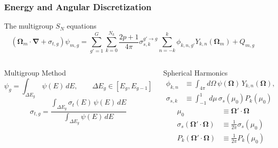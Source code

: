 \documentclass[compress,10pt]{beamer}
\renewcommand{\vec}[1]{\mathbf{#1}}
\begin{document}
\typeout{***********************************************************************************}
\begin{frame}[t]\frametitle{Energy and Angular Discretization}
\begin{block}{The multigroup $S_N$ equations}{\small
\begin{equation*}
\left( \vec{\Omega}_m \cdot \vec{\nabla}  + \sigma_{t,g}  \right)  \psi_{m,g}= \sum_{g'=1}^{G} \sum_{k=0}^{N_k} \frac{2p + 1}{4 \pi} \sigma_{s,k}^{g' \rightarrow g}   \sum_{n=-k}^{k}  \phi_{k,n,g'}  Y_{k,n} (  \vec{\Omega}_m ) +  Q_{m,g}
\end{equation*}}
\end{block}
\centering
\begin{columns}
\begin{block}{Multigroup Method}{\small
\begin{equation*}
\psi_g =\int_{\Delta E_g} \, \psi ( E) \, dE , \qquad \Delta E_g \in \left[  E_g , E_{g-1} \right]
\end{equation*} 
\begin{equation*}
\sigma_{t,g} = \frac{\int_{\Delta E_g} \sigma_t (E) \, \psi (E) \, dE }{\int_{\Delta E_g} \psi (E) \, dE }
\end{equation*} 
}\end{block}
\begin{block}{Spherical Harmonics}{\small
\vspace{-0.15cm}
\begin{equation*}
\begin{aligned}
\phi_{k,n} &\equiv \int_{4 \pi} d\Omega \, \psi(\vec{\Omega}) \, Y_{k,n} (\vec{\Omega}), \\
\sigma_{s,k} &\equiv  \int_{-1}^{1} \, d \mu \, \sigma_s ( \mu_0) P_k (\mu_0) 
\end{aligned}
\end{equation*}
\vspace{0.2cm}
\begin{equation*}
\begin{aligned}
\mu_0 &\equiv \vec{\Omega}' \cdot \vec{\Omega} \\
\sigma_s ( \vec{\Omega}' \cdot \vec{\Omega}) &\equiv  \frac{1}{2 \pi} \sigma_s ( \mu_0 ) \\
P_k ( \vec{\Omega}' \cdot \vec{\Omega}) &\equiv  \frac{1}{2 \pi} P_k (\mu_0)
\end{aligned}
\end{equation*}
}\end{block}
\end{columns}
\end{frame}
\end{document}
